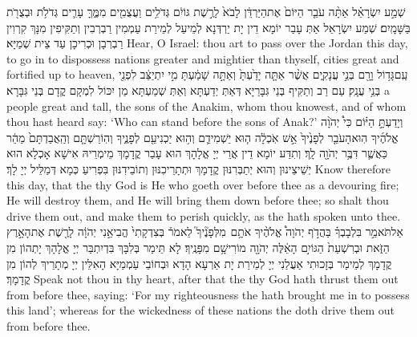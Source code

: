 \newperek
\newseder
{}%
{שְׁמַ֣ע יִשְׂרָאֵ֗ל אַתָּ֨ה עֹבֵ֤ר הַיּוֹם֙ אֶת\maqqaf הַיַּרְדֵּ֔ן לָבֹא֙ לָרֶ֣שֶׁת גּוֹיִ֔ם גְּדֹלִ֥ים וַעֲצֻמִ֖ים מִמֶּ֑ךָּ עָרִ֛ים גְּדֹלֹ֥ת וּבְצֻרֹ֖ת בַּשָּׁמָֽיִם׃}
{שְׁמַע יִשְׂרָאֵל אַתְּ עָבַר יוֹמָא דֵין יָת יַרְדְּנָא לְמֵיעַל לְמֵירַת עַמְמִין רַבְרְבִין וְתַקִּיפִין מִנָּךְ קִרְוִין רַבְרְבָן וּכְרִיכָן עַד צֵית שְׁמַיָּא׃}
{Hear, O Israel: thou art to pass over the Jordan this day, to go in to dispossess nations greater and mightier than thyself, cities great and fortified up to heaven,}{}
{עַֽם\maqqaf גָּד֥וֹל וָרָ֖ם בְּנֵ֣י עֲנָקִ֑ים אֲשֶׁ֨ר אַתָּ֤ה יָדַ֙עְתָּ֙ וְאַתָּ֣ה שָׁמַ֔עְתָּ מִ֣י יִתְיַצֵּ֔ב לִפְנֵ֖י בְּנֵ֥י עֲנָֽק׃}
{עַם רַב וְתַקִּיף בְּנֵי גִּבָּרַיָּא דְּאַתְּ יְדַעְתָּא וְאַתְּ שְׁמַעְתָּא מַן יִכּוֹל לִמְקָם קֳדָם בְּנֵי גִּבָּרָא׃}
{a people great and tall, the sons of the Anakim, whom thou knowest, and of whom thou hast heard say: ‘Who can stand before the sons of Anak?’}{}
{וְיָדַעְתָּ֣ הַיּ֗וֹם כִּי֩ יְהֹוָ֨ה אֱלֹהֶ֜יךָ הֽוּא\maqqaf הָעֹבֵ֤ר לְפָנֶ֙יךָ֙ אֵ֣שׁ אֹֽכְלָ֔ה ה֧וּא יַשְׁמִידֵ֛ם וְה֥וּא יַכְנִיעֵ֖ם לְפָנֶ֑יךָ וְהֽוֹרַשְׁתָּ֤ם וְהַֽאֲבַדְתָּם֙ מַהֵ֔ר כַּאֲשֶׁ֛ר דִּבֶּ֥ר יְהֹוָ֖ה לָֽךְ׃}
{וְתִדַּע יוֹמָא דֵין אֲרֵי יְיָ אֱלָהָךְ הוּא עָבַר קֳדָמָךְ מֵימְרֵיהּ אִישָׁא אָכְלָא הוּא יְשֵׁיצֵינוּן וְהוּא יְתַבְּרִנּוּן קֳדָמָךְ וּתְתָרֵיכִנּוּן וְתוֹבֵידִנּוּן בִּפְרִיעַ כְּמָא דְּמַלֵּיל יְיָ לָךְ׃}
{Know therefore this day, that the \lord\space thy God is He who goeth over before thee as a devouring fire; He will destroy them, and He will bring them down before thee; so shalt thou drive them out, and make them to perish quickly, as the \lord\space hath spoken unto thee.}{}
{אַל\maqqaf תֹּאמַ֣ר בִּלְבָבְךָ֗ בַּהֲדֹ֣ף יְהֹוָה֩ אֱלֹהֶ֨יךָ אֹתָ֥ם \pasek  מִלְּפָנֶ֘יךָ֮ לֵאמֹר֒ בְּצִדְקָתִי֙ הֱבִיאַ֣נִי יְהֹוָ֔ה לָרֶ֖שֶׁת אֶת\maqqaf הָאָ֣רֶץ הַזֹּ֑את וּבְרִשְׁעַת֙ הַגּוֹיִ֣ם הָאֵ֔לֶּה יְהֹוָ֖ה מוֹרִישָׁ֥ם מִפָּנֶֽיךָ׃}
{לָא תֵּימַר בְּלִבָּךְ בִּדְיִתְבַּר יְיָ אֱלָהָךְ יָתְהוֹן מִן קֳדָמָךְ לְמֵימַר בְּזָכוּתִי אַעֲלַנִי יְיָ לְמֵירַת יָת אַרְעָא הָדָא וּבְחוֹבֵי עַמְמַיָּא הָאִלֵּין יְיָ מְתָרֵיךְ לְהוֹן מִן קֳדָמָךְ׃}
{Speak not thou in thy heart, after that the \lord\space thy God hath thrust them out from before thee, saying: ‘For my righteousness the \lord\space hath brought me in to possess this land’; whereas for the wickedness of these nations the \lord\space doth drive them out from before thee.}{}
